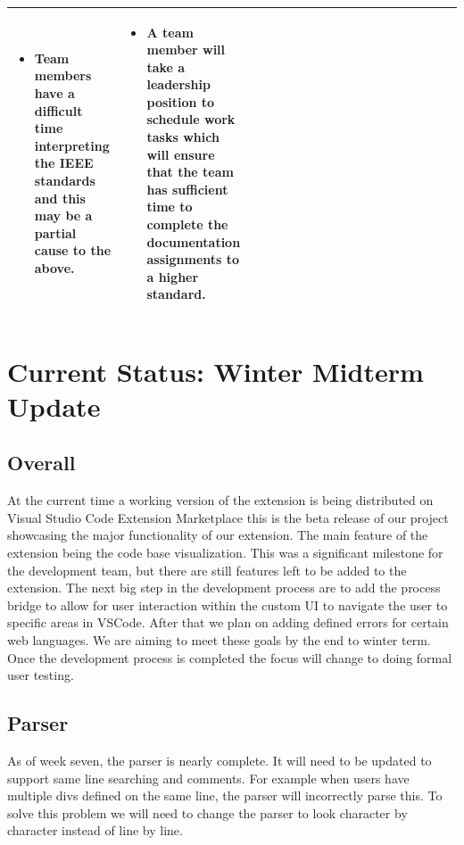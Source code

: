 \documentclass[letterpaper,10pt,titlepage,draftclsnofoot,onecolumn,onesided] {IEEEtran}
\begin{document}
\begin{center}
\begin{singlespace}
\begin{tabular}{ |  p{0.25\linewidth}  |  p{0.25\linewidth}  | p{0.25\linewidth} | p{0.25\linewidth} |}
\begin{itemize}
				\item Team members have a difficult time interpreting the IEEE standards and this may be a partial cause to the above.
			\end{itemize}
		&
			\begin{itemize}
				\item A team member will take a leadership position to schedule work tasks which will ensure that the team has sufficient time to complete the documentation assignments to a higher standard. 
			\end{itemize} 
		\\ \hline
		\end{tabular}
		\end{singlespace}
	\end{center}

\section{Current Status: Winter Midterm Update}
	
	\subsection{Overall}
	At the current time a working version of  the extension is being distributed on Visual Studio Code Extension Marketplace this is the beta release of our project showcasing the major functionality of our extension. 
	The main feature of the extension being the code base visualization. 
	This was a significant milestone for the development team, but there are still features left to be added to the extension. 
	The next big step in the development process are to add the process bridge to allow for user interaction within the custom UI to navigate the user to specific areas in VSCode.
	After that we plan on adding defined errors for certain web languages.
	We are aiming to meet these goals by the end to winter term. 
	Once the development process is completed the focus will change to doing formal user testing. 
	
	\subsection{Parser}
	As of week seven, the parser is nearly complete.
	It will need to be updated to support same line searching and comments.
	For example when users have multiple divs defined on the same line, the parser will incorrectly parse this.
	To solve this problem we will need to change the parser to look character by character instead of line by line.
	
\end{document}
